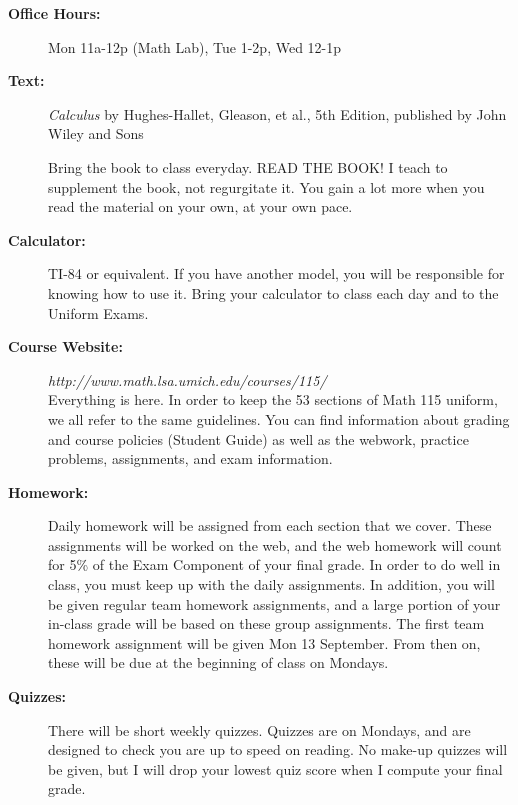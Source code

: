 \documentclass[11pt,twoside]{article}
\begin{document}
\begin{description}
\item[\bf Office Hours:] Mon 11a-12p (Math Lab), Tue 1-2p, Wed 12-1p

\vspace{.1in}
\item[\bf Text:] {\it Calculus} by Hughes-Hallet, Gleason, et al.,
5th Edition, published by John Wiley and Sons

Bring the book to class everyday.  READ THE BOOK!  I teach to supplement the book, not regurgitate it.  You gain a lot more when you read the material on your own, at your own pace.

\vspace{.1in}

\item[\bf Calculator:] TI-84 or equivalent. If you have another
model, you will be responsible for knowing how to use it.  Bring your calculator to class each day and to the Uniform Exams.

\vspace{.1in}

\item[\bf Course Website:] \emph{http://www.math.lsa.umich.edu/courses/115/}\\
Everything is here.  In order to keep the 53 sections of Math 115 uniform, we all refer to the same guidelines.  You can find information about grading and course policies (Student Guide) as well as the webwork, practice problems, assignments, and exam information.  

\vspace{.1in}

\item[\bf Homework:]  Daily homework will be assigned from each section that we cover. These assignments will be worked on the web, and the web homework will count for 5\% of the Exam Component of your final grade.  In order to do well in class, you must keep up with the daily assignments. In addition, you will be given regular team homework assignments, and a large portion of your in-class grade will be based on these group assignments.  The first team homework assignment will be given Mon 13 September.  From then on, these will be due at the beginning of class on Mondays.

\vspace{.1in}
\item[\bf Quizzes:]  There will be short weekly quizzes.  Quizzes are on Mondays, and are designed to check you are up to speed on reading.  No make-up quizzes will be given, but I will drop your lowest quiz score when I compute your final grade.


\end{description}
\end{document}
